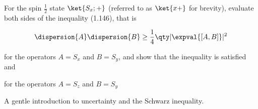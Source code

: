 \begin{question}

For the spin $\frac{1}{2}$ state $\ket{S_x; +}$ (referred to as
$\ket{x+}$ for brevity), evaluate both sides of the inequality
(1.146), that is

\begin{equation*}
  \dispersion{A}\dispersion{B} \ge \frac{1}{4} \qty|\expval{[A,B]}|^2
\end{equation*}

\begin{questionpart}
for the operators $A=S_x$ and $B=S_y$, and show that the
  inequality is satisfied and\\
\end{questionpart}

\begin{questionpart}
for the operators $A=S_z$ and $B=S_y$
\end{questionpart}

\end{question}

\begin{purpose}
  A gentle introduction to uncertainty and the Schwarz inequality.
\end{purpose}

